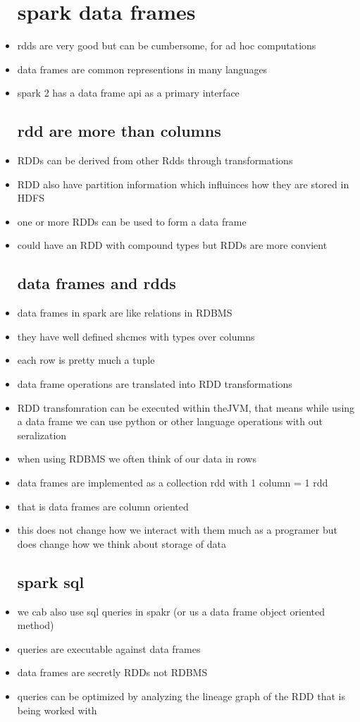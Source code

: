 \documentclass{article}
\begin{document}
\begin{itemize}
\section*{spark data frames }
\item rdds are very good but can be cumbersome, for ad hoc computations
\item data frames are common representions in many languages
\item spark 2 has a data frame api as a primary interface
\subsection*{rdd are more than columns}
\item RDDs can be derived from other Rdds through transformations
\item RDD also have partition information which influinces how they are stored in HDFS
\item one or more RDDs can be used to form a data frame 
\item could have an RDD with compound types but RDDs are more convient 
\subsection*{data frames and rdds }
\item data frames in spark are like relations in RDBMS 
\item they have well defined shcmes with types over columns 
\item each row is pretty much a tuple
\item data frame operations are translated into RDD transformations
\item RDD transfomration can be executed within theJVM, that means while using a data frame we can use python or other language operations with out seralization 
\item when using RDBMS we often think of our data in rows 
\item data frames are implemented as a collection rdd with 1 column = 1 rdd 
\item that is data frames are column oriented 
\item this does not change how we interact with them much as a programer but does change how we think about storage of data 
\subsection*{spark sql}
\item we cab also use sql queries in spakr (or us a data frame object oriented method)
\item queries are executable against data frames 
\item data frames are secretly RDDs not RDBMS
\item queries can be optimized by analyzing the lineage graph of the RDD that is being worked with 

\end{itemize}
\end{document}
